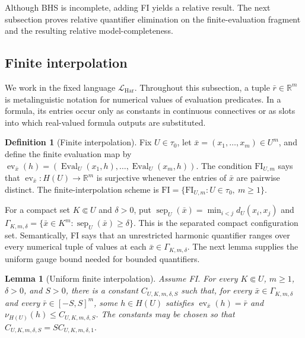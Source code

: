 \documentclass{amsart}
\newtheorem{lemma}[theorem]{Lemma}
\theoremstyle{definition}
\newtheorem{definition}{Definition}[section]
\theoremstyle{remark}
\numberwithin{equation}{section}
\begin{document}
Although BHS is incomplete, adding FI yields a relative result. The next subsection proves relative quantifier elimination on the finite-evaluation fragment and the resulting relative model-completeness.

\subsection{Finite interpolation}
\label{subsec:finite-interpolation-relative-QE}

We work in the fixed language $\mathcal L_{\mathrm{Har}}$. Throughout this subsection, a tuple $\bar r\in\mathbb R^m$ is metalinguistic notation for numerical values of evaluation predicates. In a formula, its entries occur only as constants in continuous connectives or as slots into which real-valued formula outputs are substituted.

\begin{definition}[Finite interpolation]
	\label{def:finite-interpolation}
	Fix $U\in\tau_0$, let $\bar x=(x_1,\ldots,x_m)\in U^m$, and define the finite evaluation map by $\operatorname{ev}_{\bar x}(h)=(\operatorname{Eval}_U(x_1,h),\ldots,\operatorname{Eval}_U(x_m,h))$. The condition $\mathrm{FI}_{U,m}$ says that $\operatorname{ev}_{\bar x}:H(U)\to\mathbb R^m$ is surjective whenever the entries of $\bar x$ are pairwise distinct. The finite-interpolation scheme is $\mathrm{FI}=\{\mathrm{FI}_{U,m}:U\in\tau_0,\ m\ge1\}$.
\end{definition}

For a compact set $K\Subset U$ and $\delta>0$, put $\operatorname{sep}_U(\bar x)=\min_{i<j}d_U(x_i,x_j)$ and
$\Gamma_{K,m,\delta}=\{\bar x\in K^m:\operatorname{sep}_U(\bar x)\ge\delta\}.$
This is the separated compact configuration set. Semantically, FI says that an unrestricted harmonic quantifier ranges over every numerical tuple of values at each $\bar x\in\Gamma_{K,m,\delta}$. The next lemma supplies the uniform gauge bound needed for bounded quantifiers.

\begin{lemma}[Uniform finite interpolation]
	\label{lem:uniform-finite-interpolation}
	Assume FI. For every $K\Subset U$, $m\ge1$, $\delta>0$, and $S>0$, there is a constant $C_{U,K,m,\delta,S}$ such that, for every $\bar x\in\Gamma_{K,m,\delta}$ and every $\bar r\in[-S,S]^m$, some $h\in H(U)$ satisfies $\operatorname{ev}_{\bar x}(h)=\bar r$ and $\nu_{H(U)}(h)\le C_{U,K,m,\delta,S}$. The constants may be chosen so that
	$C_{U,K,m,\delta,S}=S C_{U,K,m,\delta,1}.$
\end{lemma}
\end{document}
